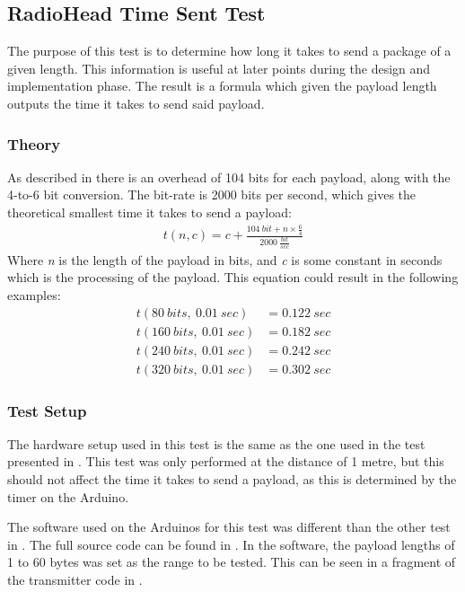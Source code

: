 \subsection{RadioHead Time Sent Test} %
\label{sub:radiohead_time_sent_test}
The purpose of this test is to determine how long it takes to send a package of a given length.
This information is useful at later points during the design and implementation phase. 
The result is a formula which given the payload length outputs the time it takes to send said payload. 

\subsubsection*{Theory}
As described in  there is an overhead of 104 bits for each payload, along with the 4-to-6 bit conversion.
The bit-rate is 2000 bits per second, which gives the theoretical smallest time it takes to send a payload:
\begin{align*}
t(n,c)=c+\frac { 104\ bit+n\times\frac { 6 }{ 4 }}{ 2000\ \frac { bit }{ sec }  } 
\end{align*}
Where \textit{n} is the length of the payload in bits, and \textit{c} is some constant in seconds which is the processing of the payload. This equation could result in the following examples:
\begin{align*}
t(80\ bits,\ 0.01\ sec) &= 0.122\ sec\\
t(160\ bits,\ 0.01\ sec) &= 0.182\ sec\\
t(240\ bits,\ 0.01\ sec) &= 0.242\ sec\\
t(320\ bits,\ 0.01\ sec) &= 0.302\ sec
\end{align*}

\subsubsection*{Test Setup}
The hardware setup used in this test is the same as the one used in the test presented in .
This test was only performed at the distance of 1 metre, but this should not affect the time it takes to send a payload, as this is determined by the timer on the Arduino.

The software used on the Arduinos for this test was different than the other test in . 
The full source code can be found in .
In the software, the payload lengths of 1 to 60 bytes was set as the range to be tested. This can be seen in a fragment of the transmitter code in .

